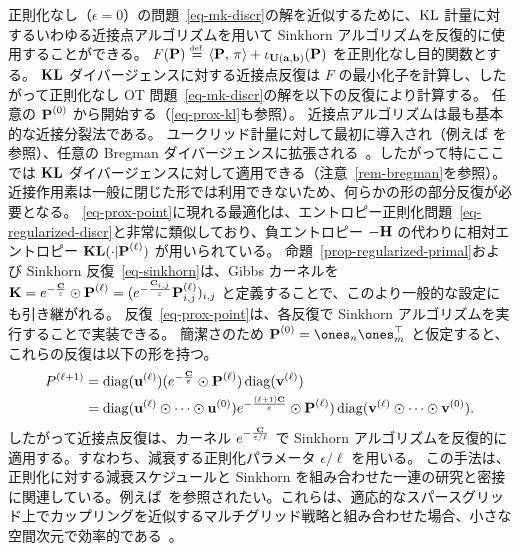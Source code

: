 \begin{rem}[近接点アルゴリズム]
正則化なし（$\epsilon=0$）の問題~\eqref{eq-mk-discr}の解を近似するために、$\operatorname{KL}$ 計量に対するいわゆる近接点アルゴリズムを用いて Sinkhorn アルゴリズムを反復的に使用することができる。
$F(\mathrm{\textbf{P}}) \stackrel{\mbox{\upshape\tiny def.}}{=} \langle \mathrm{\textbf{P}},\,\pi\rangle + \iota_{\mathrm{\textbf{U}}(\mathrm{\textbf{a}},\mathrm{\textbf{b}})}(\mathrm{\textbf{P}})$ を正則化なし目的関数とする。
$\mathrm{\textbf{KL}}$ ダイバージェンスに対する近接点反復は $F$ の最小化子を計算し、したがって正則化なし OT 問題~\eqref{eq-mk-discr}の解を以下の反復により計算する。
任意の $\mathrm{\textbf{P}}^{(0)}$ から開始する（\eqref{eq-prox-kl}も参照）。
近接点アルゴリズムは最も基本的な近接分裂法である。
ユークリッド計量に対して最初に導入され（例えば \citealt{rockafellar1976monotone}を参照）、任意の Bregman ダイバージェンスに拡張される~\citep{censor1992proximal}。したがって特にここでは $\mathrm{\textbf{KL}}$ ダイバージェンスに対して適用できる（注意~\ref{rem-bregman}を参照）。
近接作用素は一般に閉じた形では利用できないため、何らかの形の部分反復が必要となる。
\eqref{eq-prox-point}に現れる最適化は、エントロピー正則化問題~\eqref{eq-regularized-discr}と非常に類似しており、負エントロピー $-\mathrm{\textbf{H}}$ の代わりに相対エントロピー $\mathrm{\textbf{KL}}(\cdot|\mathrm{\textbf{P}}^{(\ell)})$ が用いられている。
命題~\ref{prop-regularized-primal}および Sinkhorn 反復~\eqref{eq-sinkhorn}は、Gibbs カーネルを $\mathrm{\textbf{K}}=e^{-\frac{\mathrm{\textbf{C}}}{\varepsilon}} \odot \mathrm{\textbf{P}}^{(\ell)} = ( e^{-\frac{\mathrm{\textbf{C}}_{i,j}}{\varepsilon}} \mathrm{\textbf{P}}^{(\ell)}_{i,j} )_{i,j}$ と定義することで、このより一般的な設定にも引き継がれる。
反復~\eqref{eq-prox-point}は、各反復で Sinkhorn アルゴリズムを実行することで実装できる。
簡潔さのため $\init{\P}=\ones_n \ones_m^\top$ と仮定すると、これらの反復は以下の形を持つ。
\begin{align*}
	P^{(\ell+1)} &=
		\operatorname{diag}(\mathrm{\textbf{u}}^{(\ell)}) ( e^{-\frac{\mathrm{\textbf{C}}}{\varepsilon}} \odot \mathrm{\textbf{P}}^{(\ell)} ) \operatorname{diag}(\mathrm{\textbf{v}}^{(\ell)})\\
		&=
		\operatorname{diag}(\mathrm{\textbf{u}}^{(\ell)} \odot \cdots \odot \mathrm{\textbf{u}}^{(0)})
			e^{-\frac{(\ell+1)\mathrm{\textbf{C}}}{\varepsilon}} \odot \mathrm{\textbf{P}}^{(\ell)} )
		\operatorname{diag}(\mathrm{\textbf{v}}^{(\ell)} \odot \cdots \odot \mathrm{\textbf{v}}^{(0)}).
\end{align*}
したがって近接点反復は、カーネル $e^{-\frac{\mathrm{\textbf{C}}}{\varepsilon/\ell}}$ で Sinkhorn アルゴリズムを反復的に適用する。すなわち、減衰する正則化パラメータ $\epsilon/\ell$ を用いる。
この手法は、正則化に対する減衰スケジュールと Sinkhorn を組み合わせた一連の研究と密接に関連している。例えば~\citep{kosowsky1994invisible}を参照されたい。これらは、適応的なスパースグリッド上でカップリングを近似するマルチグリッド戦略と組み合わせた場合、小さな空間次元で効率的である~\citep{schmitzer2016stabilized}。
\end{rem}


